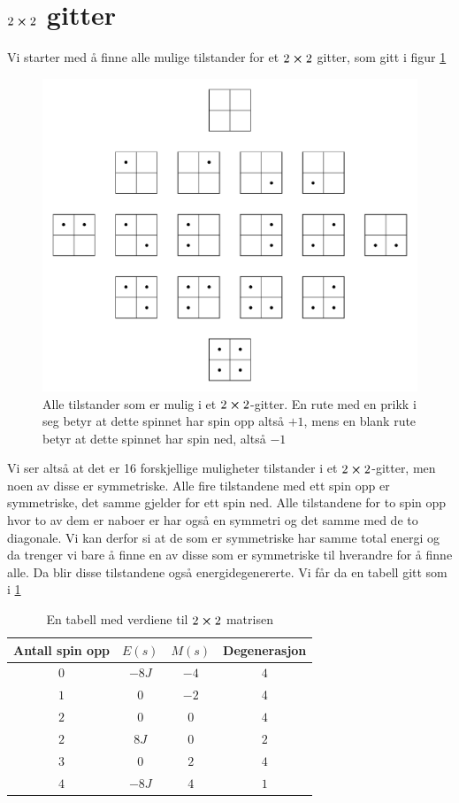 \documentclass[reprint,english,notitlepage]{revtex4-2}  %
\begin{document}
\newpage
\appendix
\section{$2\cross 2$ gitter}
Vi starter med å finne alle mulige tilstander for et $2\cross 2$ gitter, som gitt i figur \ref{2x2}
\begin{figure}[H]
	\label{2x2}
	\includegraphics[scale=0.5]{Latice.pdf}
	\caption{Alle tilstander som er mulig i et $2\cross2$-gitter. En rute med en prikk i seg betyr at dette spinnet har spin opp altså $+1$, mens en blank rute betyr at dette spinnet har spin ned, altså $-1$}
\end{figure}
Vi ser altså at det er 16 forskjellige muligheter tilstander i et $2\cross2$-gitter, men noen av disse er symmetriske. Alle fire tilstandene med ett spin opp er symmetriske, det samme gjelder for ett spin ned. Alle tilstandene for to spin opp hvor to av dem er naboer er har også en symmetri og det samme med de to diagonale. Vi kan derfor si at de som er symmetriske har samme total energi og da trenger vi bare å finne en av disse som er symmetriske til hverandre for å finne alle. Da blir disse tilstandene også energidegenererte. Vi får da en tabell gitt som i \ref{2x2tabell}
\begin{table}[H]
	\begin{tabular}{|c|c|c|c|} %
		\hline                    %
		Antall spin opp & $E(s)$ & $M(s)$& Degenerasjon  \\
		\hline
		$0$ & $-8J$ & $-4$ & $4$ \\
		\hline
		$1$ & $0$ & $-2$ & 4\\
		\hline
		$2$ &$0$ &$0$ &$4$ \\\hline 
		$2$ &$8J$ &$0$&$2$ \\\hline 
		$3$&$0$&$2$&$4$ \\\hline 
		$4$&$-8J$&$4$&$1$ \\\hline 
	\end{tabular}
\caption{En tabell med verdiene til $2\cross 2$ matrisen}
\label{2x2tabell}
\end{table}
\end{document}
